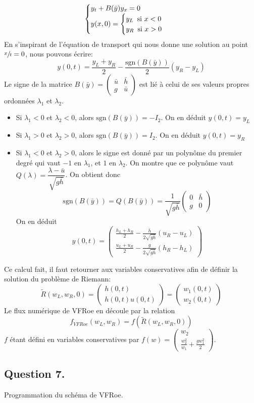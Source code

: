 \documentclass[
	french,
	11pt, %
]{fphw}
\newcommand{\myvec}[2]{\begin{pmatrix} #1  \\ #2 \end{pmatrix}}   %
\newcommand{\mymat}[4]{\begin{pmatrix} #1 & #2 \\ #3 & #4 \end{pmatrix}}  %
\newcommand{\hquad}{\hspace{0.5em}} %
\begin{document}
\begin{align}
	\begin{cases}
		y_t + B(\bar{y})y_x = 0 \\
		y(x,0) = \begin{cases}
			y_L \hquad \text{si  } x < 0\\
			y_R \hquad \text{si  } x > 0 
		\end{cases}
	\end{cases}
\end{align}
En s'inspirant de l'équation de transport qui nous donne une solution au point $\sfrac{x}{t}=0$, nous pouvons écrire:
$$
y(0,t)=\frac{y_L+y_R}{2} - \frac{\text{sgn}(B(\bar{y}))}{2}(y_R-y_L)
$$
Le signe de la matrice $B(\bar{y})=\mymat{\bar u}{\bar h}{g}{\bar u}$ est lié à celui de ses valeurs propres ordonnées $\lambda_1$ et $\lambda_2$. 
\begin{itemize}
	\item Si $\lambda_1 < 0$ et $\lambda_2 < 0$, alors $\text{sgn}(B(\bar{y}))= -I_2$. On en déduit $y(0,t)=y_L$
	\item Si $\lambda_1 > 0$ et $\lambda_2 > 0$, alors $\text{sgn}(B(\bar{y}))= I_2$. On en déduit $y(0,t)=y_R$
	\item Si $\lambda_1 < 0$ et $\lambda_2 > 0$, alors le signe est donné par un polynôme du premier degré qui vaut $-1$ en $\lambda_1$, et $1$ en $\lambda_2$. On montre que ce polynôme vaut $Q(\lambda)= \dfrac{\lambda - \bar{u}}{\sqrt{g\bar h}}$. On obtient donc 
	$$
	\text{sgn}(B(\bar{y})) =Q(B(\bar{y}))= \frac{1}{\sqrt{g\bar{h}}}\mymat{0}{\bar{h}}{g}{0}
	$$
	On en déduit
	$$
	y(0,t)=\myvec{\frac{h_L+h_R}{2} - \frac{\bar{h}}{2\sqrt{g\bar{h}}}(u_R-u_L)}{\frac{u_L+u_R}{2} - \frac{g}{2\sqrt{g\bar{h}}}(h_R-h_L)}
	$$
\end{itemize}
Ce calcul fait, il faut retourner aux variables conservatives afin de définir la solution du problème de Riemann:
$$
\tilde{R}(w_L, w_R, 0) = \myvec{h(0,t)}{h(0,t)u(0,t)} = \myvec{w_1(0,t)}{w_2(0,t)} 
$$
Le flux numérique de VFRoe en découle par la relation 
$$
f_{VFRoe}(w_L, w_R) = f(\tilde{R}(w_L, w_R, 0))
$$
$f$ étant défini en variables conservatives par $ f(w) = \myvec{w_2}{\frac{w_2^2}{w_1} + \frac{gw_1^2}{2}}$.

\subsection*{Question 7.}
\begin{problem}
Programmation du schéma de VFRoe.
\end{problem}
\end{document}
